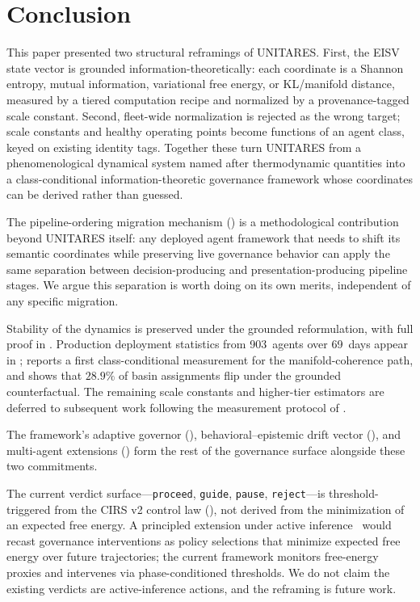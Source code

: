 \documentclass[11pt,twocolumn]{article}
\begin{document}
\section{Conclusion}
\label{sec:conclusion}

This paper presented two structural reframings of UNITARES.
First, the EISV state vector is grounded information-theoretically:
each coordinate is a Shannon entropy, mutual information,
variational free energy, or KL/manifold distance, measured by a
tiered computation recipe and normalized by a provenance-tagged
scale constant. Second, fleet-wide normalization is rejected as
the wrong target; scale constants and healthy operating points
become functions of an agent class, keyed on existing identity
tags. Together these turn UNITARES from a phenomenological
dynamical system named after thermodynamic quantities into a
class-conditional information-theoretic governance framework
whose coordinates can be derived rather than guessed.

The pipeline-ordering migration mechanism
() is a methodological contribution
beyond UNITARES itself: any deployed agent framework that needs
to shift its semantic coordinates while preserving live governance
behavior can apply the same separation between decision-producing
and presentation-producing pipeline stages. We argue this
separation is worth doing on its own merits, independent of any
specific migration.

Stability of the dynamics is preserved under the grounded
reformulation, with full proof in .
Production deployment statistics from 903~agents over 69~days
appear in ; 
reports a first class-conditional measurement for the
manifold-coherence path, and
 shows that $28.9\%$ of basin
assignments flip under the grounded counterfactual. The remaining
scale constants and higher-tier estimators are deferred to
subsequent work following the measurement protocol of
.

The framework's adaptive governor (),
behavioral--epistemic drift vector (),
and multi-agent extensions () form the rest of
the governance surface alongside these two commitments.

The current verdict surface---\texttt{proceed}, \texttt{guide},
\texttt{pause}, \texttt{reject}---is threshold-triggered from the
CIRS v2 control law (), not derived from the
minimization of an expected free energy. A principled extension
under active inference~\cite{parr2022active,dacosta2020active}
would recast governance interventions as policy selections that
minimize expected free energy over future trajectories; the current
framework monitors free-energy proxies and intervenes via
phase-conditioned thresholds. We do not claim the existing verdicts
are active-inference actions, and the reframing is future work.
\end{document}
